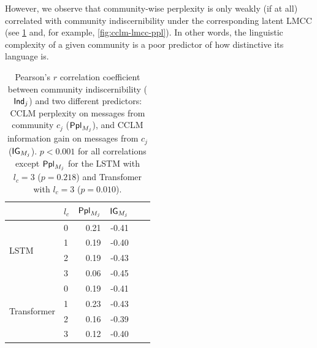 \documentclass[11pt]{article}
\begin{document}
However, we observe that community-wise perplexity is only weakly (if at all) 
correlated with community indiscernibility under the corresponding latent 
LMCC (see \cref{tab:ind-corrs} and, for example, \cref{fig:cclm-lmcc-ppl}).
In other words, the linguistic complexity of a given community
is a poor predictor of how distinctive its language is.
%
\begin{table}
  \small
  \centering
  \begin{tabular}{llrrrr}
  \toprule
      & $l_c$ & $\mathsf{Ppl}_{M_j}$ & $\mathsf{IG}_{M_j}$ \\
  \midrule
  \multirow{4}{*}{LSTM}         & 0 &         0.21 &         -0.41 \\
                                & 1 &         0.19 &         -0.40 \\
                                & 2 &         0.19 &         -0.43 \\
                                & 3 &         0.06 &         -0.45 \\
  \midrule
  \multirow{4}{*}{Transformer}  & 0 &         0.19 &         -0.41 \\
                                & 1 &         0.23 &         -0.43 \\
                                & 2 &         0.16 &         -0.39 \\
                                & 3 &         0.12 &         -0.40 \\
  \bottomrule
  \end{tabular}
  \caption{ Pearson's $r$ correlation coefficient between community
    indiscernibility ($\mathsf{Ind}_j$) and two different predictors: CCLM
    perplexity on messages from community $c_j$ ($\mathsf{Ppl}_{M_j}$), and
    CCLM information gain on messages from $c_j$ ($\mathsf{IG}_{M_j}$). $p < 0.001$
    for all correlations except $\mathsf{Ppl}_{M_j}$ for the LSTM with 
  $l_c=3$ ($p=0.218$) and Transfomer with $l_c=3$ ($p=0.010$).}
  \label{tab:ind-corrs}
\end{table}
\end{document}
